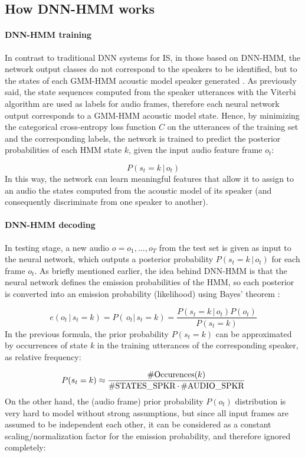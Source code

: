\subsection{How DNN-HMM works}

\paragraph{DNN-HMM training}
In contrast to traditional DNN systems for IS, in those based on DNN-HMM, the network output classes do not correspond to the speakers to be identified, but to the states of each GMM-HMM acoustic model speaker generated \cite{si:dnnhmm}. As previously said, the state sequences computed from the speaker utterances with the Viterbi algorithm are used as labels for audio frames, therefore each neural network output corresponds to a GMM-HMM acoustic model state.
Hence, by minimizing the categorical cross-entropy loss function $C$ on the utterances of the training set and the corresponding labels, the network is trained to predict the posterior probabilities of each HMM state $k$, given the input audio feature frame $o_t$:

$$P(s_{t} = k \, | \, o_t)$$
In this way, the network can learn meaningful features that allow it to assign to an audio the states computed from the acoustic model of its speaker (and consequently discriminate from one speaker to another).

\paragraph{DNN-HMM decoding}
In testing stage, a new audio $o = o_1, ..., o_T$ from the test set is given as input to the neural network, which outputs a posterior probability $P(s_{t} = k \, | \, o_t)$ for each frame $o_t$. As briefly mentioned earlier, the idea behind DNN-HMM is that the neural network defines the emission probabilities of the HMM, so each posterior is converted into an emission probability (likelihood) using Bayes' theorem \cite{si:dnnhmm}:

$$e(o_t \, | \, s_{t} = k) = P(\, o_t | \, s_{t} = k) = \frac{P(s_{t} = k \, | \, o_t) P(o_t)}{P(s_{t} = k)}$$
In the previous formula, the prior probability $P(s_t = k)$ can be approximated by occurrences of state $k$ in the training utterances of the corresponding speaker, as relative frequency:

$$P(s_t = k) \approx \frac{\operatorname{\#Occurences}(k)}{\operatorname{\#STATES\_SPKR} \cdot \operatorname{\#AUDIO\_SPKR}} $$
On the other hand, the (audio frame) prior probability $P(o_t)$ distribution is very hard to model without strong assumptions, but since all input frames are assumed to be independent each other, it can be considered as a constant scaling/normalization factor for the emission probability, and therefore ignored completely:

